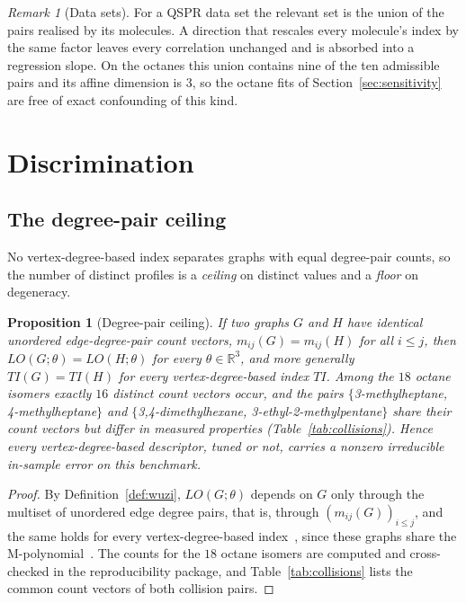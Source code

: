 \documentclass[a5paper, 10pt]{article}
\theoremstyle{plain}
\newtheorem{proposition}[theorem]{Proposition}
\theoremstyle{remark}
\newtheorem*{remark}{Remark}
\theoremstyle{definition}
\begin{document}
  \begin{remark}[Data sets]\label{rem:dataset}
  For a QSPR data set the relevant set is the union of the pairs
  realised by its molecules. A direction that rescales every
  molecule's index by the same factor leaves every correlation
  unchanged and is absorbed into a regression slope. On the octanes
  this union contains nine of the ten admissible pairs and its affine
  dimension is $3$, so the octane fits of
  Section~\ref{sec:sensitivity} are free of exact confounding of this
  kind.
  \end{remark}

\section{Discrimination}\label{sec:discrimination}

\subsection{The degree-pair ceiling}\label{sec:ceiling}

No vertex-degree-based index separates graphs with equal degree-pair
counts, so the number of distinct profiles is a \emph{ceiling} on
distinct values and a \emph{floor} on degeneracy.

  \begin{proposition}[Degree-pair ceiling]\label{prop:collision}
  If two graphs $G$ and $H$ have identical unordered
  edge-degree-pair count vectors, $m_{ij}(G) = m_{ij}(H)$ for all
  $i \le j$, then $LO(G;\theta) = LO(H;\theta)$ for every
  $\theta \in \mathbb{R}^3$, and more generally
  $TI(G) = TI(H)$ for every vertex-degree-based index $TI$. Among the
  $18$ octane isomers exactly $16$ distinct count vectors occur, and the
  pairs $\{$3-methylheptane, 4-methylheptane$\}$ and
  $\{$3,4-dimethylhexane, 3-ethyl-2-methylpentane$\}$ share their
  count vectors but differ in measured properties
  (Table~\ref{tab:collisions}). Hence every vertex-degree-based
  descriptor, tuned or not, carries a nonzero irreducible in-sample error on this benchmark.
  \end{proposition}

  \begin{proof}
  By Definition~\ref{def:wuzi}, $LO(G;\theta)$ depends on $G$ only
  through the multiset of unordered edge degree pairs, that is, through
  $(m_{ij}(G))_{i \le j}$, and the same holds for every vertex-degree-based
  index~\cite{Rada2026LinearVDB}, since these graphs share the M-polynomial~\cite{DeutschKlavzar2015}. The counts for the $18$ octane
  isomers are computed and cross-checked in the reproducibility
  package, and Table~\ref{tab:collisions} lists the common count
  vectors of both collision pairs.
  \end{proof}
\end{document}
